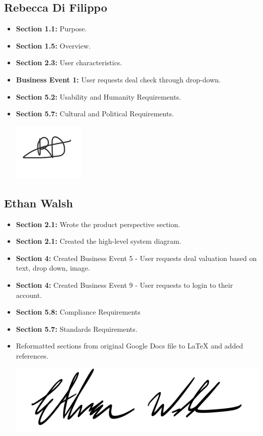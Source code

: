 \documentclass[]{article}
\begin{document}
\subsection{Rebecca Di Filippo}
\begin{itemize}
    \item \textbf{Section 1.1:} Purpose.
    \item \textbf{Section 1.5:} Overview.
    \item \textbf{Section 2.3:} User characteristics.
    \item \textbf{Business Event 1:} User requests deal check through drop-down.
    \item \textbf{Section 5.2:} Usability and Humanity Requirements.
    \item \textbf{Section 5.7:} Cultural and Political Requirements.
    \begin{center}
        \includegraphics[scale=2]{Images/rebecca.png}
    \end{center}
\end{itemize}

\subsection{Ethan Walsh}
\begin{itemize}
    \item \textbf{Section 2.1:} Wrote the product perspective section.
    \item \textbf{Section 2.1:} Created the high-level system diagram.
    \item \textbf{Section 4:} Created Business Event 5 - User requests deal valuation based on text, drop down, image.
    \item \textbf{Section 4:} Created Business Event 9 - User requests to login to their account.
    \item \textbf{Section 5.8:} Compliance Requirements
    \item \textbf{Section 5.7:} Standards Requirements.
    \item Reformatted sections from original Google Docs file to LaTeX and added references.
    \begin{center}
        \includegraphics[scale=0.7]{Images/ethan.png}
    \end{center}
\end{itemize}
\end{document}
